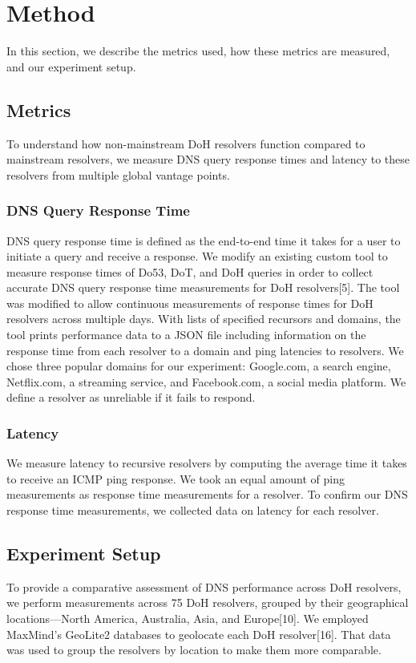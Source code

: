 \section{Method}\label{sec:method}

In this section, we describe the metrics used, how these metrics are measured, and our experiment setup.


\subsection{Metrics}
To understand how non-mainstream DoH resolvers function compared to mainstream resolvers, we measure DNS query response times and latency to these resolvers from multiple global vantage points.

\subsubsection{DNS Query Response Time}
DNS query response time is defined as the end-to-end time it takes for a user to initiate a query and receive a response.
We modify an existing custom tool to measure response times of Do53, DoT, and DoH queries in order to collect accurate DNS query response time measurements for DoH resolvers[5].
The tool was modified to allow continuous measurements of response times for DoH resolvers across multiple days.
With lists of specified recursors and domains, the tool prints performance data to a JSON file including information on the response time from each resolver to a domain and ping latencies to resolvers.
We chose three popular domains for our experiment: Google.com, a search engine, Netflix.com, a streaming service, and Facebook.com, a social media platform. 
We define a resolver as unreliable if it fails to respond.  

\subsubsection{Latency}
We measure latency to recursive resolvers by computing the average time it takes to receive an ICMP ping response.
We took an equal amount of ping measurements as response time measurements for a resolver.
To confirm our DNS response time measurements, we collected data on latency for each resolver. 

\subsection{Experiment Setup}
To provide a comparative assessment of DNS performance across DoH resolvers, we perform measurements across 75 DoH resolvers, grouped by their geographical locations—North America, Australia, Asia, and Europe[10].
We employed MaxMind's GeoLite2 databases to geolocate each DoH resolver[16].
That data was used to group the resolvers by location to make them more comparable. 

